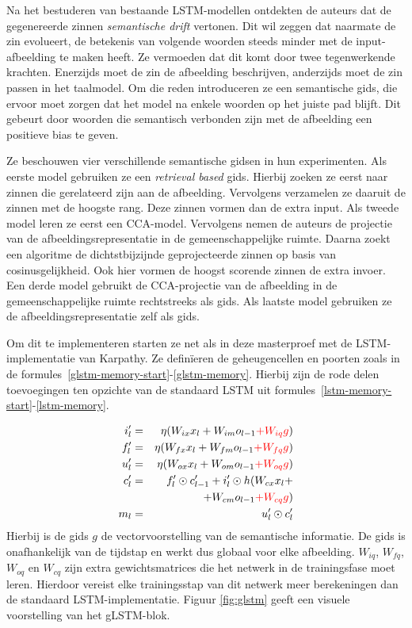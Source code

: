 Na het bestuderen van bestaande LSTM-modellen ontdekten de auteurs dat de gegenereerde zinnen \emph{semantische drift} vertonen. Dit wil zeggen dat naarmate de zin evolueert, de betekenis van volgende woorden steeds minder met de input-afbeelding te maken heeft. Ze vermoeden dat dit komt door twee tegenwerkende krachten. Enerzijds moet de zin de afbeelding beschrijven, anderzijds moet de zin passen in het taalmodel. Om die reden introduceren ze een semantische gids, die ervoor moet zorgen dat het model na enkele woorden op het juiste pad blijft. Dit gebeurt door woorden die semantisch verbonden zijn met de afbeelding een positieve bias te geven.

Ze beschouwen vier verschillende semantische gidsen in hun experimenten. Als eerste model gebruiken ze een \emph{retrieval based} gids. Hierbij zoeken ze eerst naar zinnen die gerelateerd zijn aan de afbeelding. Vervolgens verzamelen ze daaruit de zinnen met de hoogste rang. Deze zinnen vormen dan de extra input.
Als tweede model leren ze eerst een CCA-model. Vervolgens nemen de auteurs de projectie van de afbeeldingsrepresentatie in de gemeenschappelijke ruimte. Daarna zoekt een algoritme de dichtstbijzijnde geprojecteerde zinnen op basis van cosinusgelijkheid. Ook hier vormen de hoogst scorende zinnen de extra invoer.
Een derde model gebruikt de CCA-projectie van de afbeelding in de gemeenschappelijke ruimte rechtstreeks als gids.
Als laatste model gebruiken ze de afbeeldingsrepresentatie zelf als gids.

Om dit te implementeren starten ze net als in deze masterproef met de LSTM-implementatie van Karpathy. Ze defin\"ieren de geheugencellen en poorten zoals in de formules~\eqref{glstm-memory-start}-\eqref{glstm-memory}. Hierbij zijn de rode delen toevoegingen ten opzichte van de standaard LSTM uit formules~\eqref{lstm-memory-start}-\eqref{lstm-memory}.

%
\begin{eqnarray}
\vspace{-3mm}
\label{glstm-memory-start}
i_l' & = & \eta (W_{ix} x_l + W_{im} o_{l-1} \color{red}{+ W_{iq} g}\color{black}) \label{glstm-input} \\
f_l' & = & \eta (W_{fx} x_l + W_{fm} o_{l-1} \color{red}{+ W_{fq} g}\color{black}) \\
u_l' & = & \eta (W_{ox} x_l + W_{om} o_{l-1} \color{red}{+ W_{oq} g}\color{black}) \\
c_l' & = & f_l' \odot c_{l-1}' + i_l' \odot h(W_{cx} x_l + \nonumber \\
&   & + W_{cm} o_{l-1} \color{red}{+ W_{cq} g}\color{black}) \\
m_l & = & u_l' \odot c_l'
\label{glstm-memory}
\vspace{-3mm}
\end{eqnarray}
Hierbij is de gids $g$ de vectorvoorstelling van de semantische informatie. De gids is onafhankelijk van de tijdstap en werkt dus globaal voor elke afbeelding. $W_{iq}$, $W_{fq}$, $W_{oq}$ en $W_{cq}$ zijn extra gewichtsmatrices die het netwerk in de trainingsfase moet leren. Hierdoor vereist elke trainingsstap van dit netwerk meer berekeningen dan de standaard LSTM-implementatie. Figuur \ref{fig:glstm} geeft een visuele voorstelling van het gLSTM-blok.


